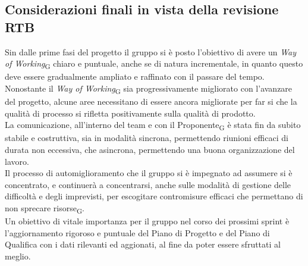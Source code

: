 \subsection{Considerazioni finali in vista della revisione RTB}
Sin dalle prime fasi del progetto il gruppo si è posto l'obiettivo di avere un \textit{Way of Working}\textsubscript{G} chiaro e puntuale, anche se di natura incrementale, in quanto questo deve essere gradualmente ampliato e raffinato con il passare del tempo. Nonostante il \textit{Way of Working}\textsubscript{G}  sia progressivamente migliorato con l’avanzare del progetto, alcune aree necessitano di essere ancora migliorate per far si che la qualità di processo si rifletta positivamente sulla qualità di prodotto. \\
La comunicazione, all'interno del team e con il Proponente\textsubscript{G} è stata fin da subito stabile e costruttiva, sia in modalità sincrona, permettendo riunioni efficaci di durata non eccessiva, che asincrona, permettendo una buona organizzazione del lavoro. \\
Il processo di automiglioramento che il gruppo si è impegnato ad assumere si è concentrato, e continuerà a concentrarsi, anche sulle modalità di gestione delle difficoltà e degli imprevisti, per escogitare contromisure efficaci che permettano di non sprecare risorse\textsubscript{G}. \\
Un obiettivo di vitale importanza per il gruppo nel corso dei prossimi sprint è l'aggiornamento rigoroso e puntuale del Piano di Progetto e del Piano di Qualifica con i dati rilevanti ed aggionati, al fine da poter essere sfruttati al meglio. \\

